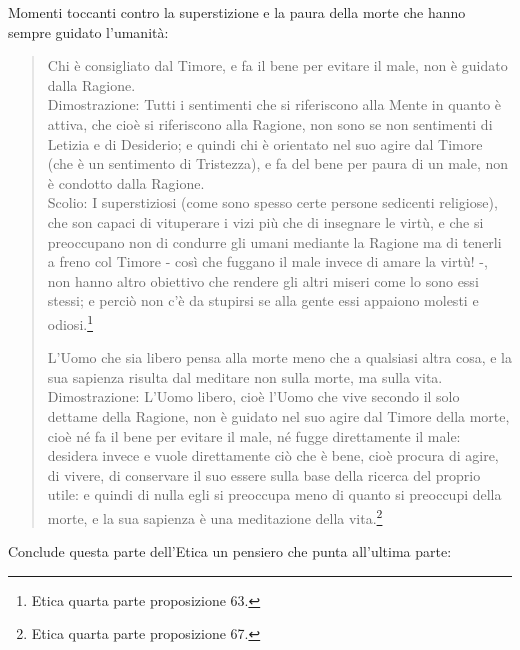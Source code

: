 Momenti toccanti contro la superstizione e la paura della morte che hanno sempre guidato l'umanità:

\begin{quotation}
	\small Chi è consigliato dal Timore, e fa il bene per evitare il male, non è guidato dalla Ragione.\\
	Dimostrazione: Tutti i sentimenti che si riferiscono alla Mente in quanto è attiva, che
	cioè si riferiscono alla Ragione, non sono se non sentimenti di Letizia e di Desiderio; e quindi chi è orientato nel suo agire dal Timore (che è un sentimento di Tristezza), e fa del bene
	per paura di un male, non è condotto dalla Ragione.\\
	Scolio: I superstiziosi (come sono spesso certe persone sedicenti religiose), che
	son capaci di vituperare i vizi più che di insegnare le virtù, e che si preoccupano non di condurre gli umani mediante la Ragione ma di tenerli a freno col Timore - così che fuggano il
	male invece di amare la virtù! -, non hanno altro obiettivo che rendere gli altri miseri come
	lo sono essi stessi; e perciò non c’è da stupirsi se alla gente essi appaiono molesti e odiosi.\footnote{Etica quarta parte proposizione 63.}
	
	L’Uomo che sia libero pensa alla morte meno che a qualsiasi altra cosa, e la sua sapienza
	risulta dal meditare non sulla morte, ma sulla vita.\\
	Dimostrazione: L’Uomo libero, cioè l’Uomo che vive secondo il solo dettame della Ragione, non è guidato nel suo agire dal Timore della morte, cioè né fa il bene per evitare il male,
	né fugge direttamente il male: desidera invece e vuole direttamente ciò che è bene, cioè
	procura di agire, di vivere, di conservare il suo essere sulla base della ricerca del proprio
	utile: e quindi di nulla egli si preoccupa meno di quanto si preoccupi della
	morte, e la sua sapienza è una meditazione della vita.\footnote{Etica quarta parte proposizione 67.}
\end{quotation}

Conclude questa parte dell'Etica un pensiero che punta all'ultima parte:

